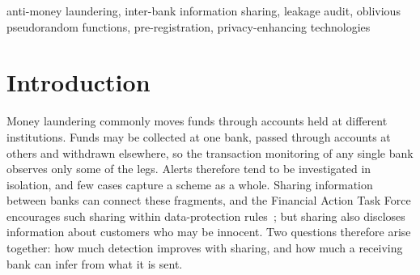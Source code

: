 \documentclass[conference]{IEEEtran}
\begin{document}
\begin{abstract}
A laundering scheme usually touches several banks, and each bank's monitoring sees only
its own part of it. We design and evaluate a privacy-preserving protocol in which banks
answer each other's queries with minimised evidence about counterparty accounts (an alert
flag, a probability bucket and bucketed behaviour counters), addressed by tokens from an
oblivious pseudorandom function. All hypotheses were pre-registered and decided once on
sealed test data from the synthetic AMLworld benchmark; improvements made afterwards were
confirmed on two further test windows that had never been opened. On the unopened
high-illicit window, sharing raised the share of laundering schemes linked into one case
from 0.063 to 0.534 (gain 0.47, 95\% CI [0.43, 0.51]), recovering 0.92 of the gain of a
pooled relational model. The gain was significant on all four sealed tests, persisted
without the suspected simulator artefacts, and persisted with a per-bank version of a
transaction-level detector that outperforms published gradient-boosting results on
AMLworld. On the replication windows, analysts reviewed 6.8 to 8.5 times fewer alerts per
linked scheme. An attack-based leakage audit found that the plain alert flag reveals high
fan-in in the low-illicit data; a gated flag selected on validation removed this leakage on
the replication windows while keeping 93--100\% of the flag's detection gain. Typology
attribution did not replicate, and the oblivious tokens reduced re-identification 8 to 9
times relative to hashing, short of the pre-registered tenfold target.
\end{abstract}

\begin{IEEEkeywords}
anti-money laundering, inter-bank information sharing, leakage audit, oblivious
pseudorandom functions, pre-registration, privacy-enhancing technologies
\end{IEEEkeywords}

\section{Introduction}

Money laundering commonly moves funds through accounts held at different institutions.
Funds may be collected at one bank, passed through accounts at others and withdrawn
elsewhere, so the transaction monitoring of any single bank observes only some of the legs.
Alerts therefore tend to be investigated in isolation, and few cases capture a scheme as a
whole. Sharing information between banks can connect these fragments, and the Financial
Action Task Force encourages such sharing within data-protection
rules~\cite{fatf2021stocktake,fatf2022partnering}; but sharing also discloses information
about customers who may be innocent. Two
questions therefore arise together: how much detection improves with sharing, and how much
a receiving bank can infer from what it is sent.
\end{document}
